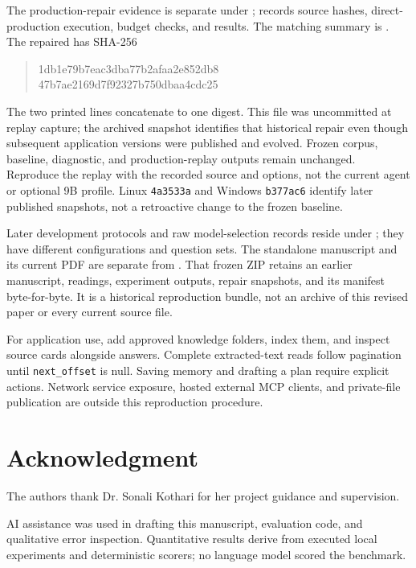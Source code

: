 \documentclass[conference,letterpaper]{IEEEtran}
\newcommand{\code}[1]{\texttt{#1}}
\begin{document}
The production-repair evidence is separate under ;  records source hashes, direct-production execution, budget checks, and results. The matching summary is . The repaired  has SHA-256
\begin{quote}\ttfamily\footnotesize
1db1e79b7eac3dba77b2afaa2e852db8\\
47b7ae2169d7f92327b750dbaa4cdc25
\end{quote}
The two printed lines concatenate to one digest. This file was uncommitted at replay capture; the archived snapshot identifies that historical repair even though subsequent application versions were published and evolved. Frozen corpus, baseline, diagnostic, and production-replay outputs remain unchanged. Reproduce the replay with the recorded source and options, not the current agent or optional 9B profile. Linux \code{4a3533a} and Windows \code{b377ac6} identify later published snapshots, not a retroactive change to the frozen baseline.

Later development protocols and raw model-selection records reside under ; they have different configurations and question sets. The standalone manuscript and its current PDF are separate from . That frozen ZIP retains an earlier manuscript, readings, experiment outputs, repair snapshots, and its manifest byte-for-byte. It is a historical reproduction bundle, not an archive of this revised paper or every current source file.

For application use, add approved knowledge folders, index them, and inspect source cards alongside answers. Complete extracted-text reads follow pagination until \code{next\_offset} is null. Saving memory and drafting a plan require explicit actions. Network service exposure, hosted external MCP clients, and private-file publication are outside this reproduction procedure.

\section*{Acknowledgment}
The authors thank Dr. Sonali Kothari for her project guidance and supervision.

AI assistance was used in drafting this manuscript, evaluation code, and qualitative error inspection. Quantitative results derive from executed local experiments and deterministic scorers; no language model scored the benchmark.
\end{document}
